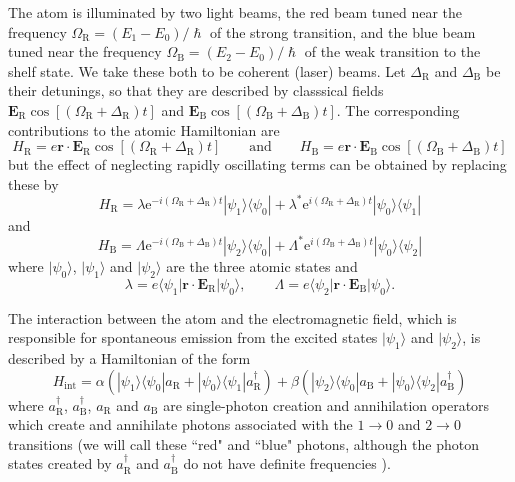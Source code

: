 \documentclass[12pt,a4paper,reqno]{article}
\newcommand{\upline}{\vspace{-\abovedisplayskip}\vspace{-\baselineskip}}
\renewcommand{\(}{\left(}
\renewcommand{\)}{\right)}
\newcommand{\e}{\mbox{e}}
\renewcommand{\hbar}{\hslash}
\newcommand{\tR}{\text{R}}
\newcommand{\tB}{\text{B}}
\newcommand{\br}{\mathbf{r}}
\newcommand{\bE}{\mathbf{E}}
\newcommand{\<}{\langle}
\renewcommand{\>}{\rangle}
\theoremstyle{plain} %
\theoremstyle{definition}
\theoremstyle{remark}
\begin{document}
The atom is illuminated by two light beams, the red
beam tuned near the frequency $\Omega_{\tR} = (E_1 - E_0)/\hbar$
of the strong transition, and the blue beam
tuned near the frequency $\Omega_{\tB} = (E_2 - E_0)/\hbar$ of the
weak transition to the shelf state. We take these both to be coherent
(laser) beams. Let $\Delta_{\tR}$ and $\Delta_{\tB}$ be their detunings, so
that they are described by classsical fields $\bE_{\tR}\cos[(\Omega_{\tR}
+ \Delta_{\tR})t]$ and $\bE_{\tB}\cos[(\Omega_{\tB} + \Delta_{\tB})t]$. The
corresponding contributions to the atomic Hamiltonian are
\[
H_{\tR} = e\br\cdot\bE_{\tR}\cos[(\Omega_{\tR} + \Delta_{\tR})t] \qquad \text{and}
\qquad H_{\tB} = e\br\cdot\bE_{\tB}\cos[(\Omega_{\tB} + \Delta_{\tB})t]
\]
but the effect of neglecting rapidly oscillating terms can be obtained
by replacing these by 
\begin{equation}
H_{\tR} = \lambda \e^{-i(\Omega_{\tR} + \Delta_{\tR})t}|\psi_1\>\<\psi_0| +
        \lambda^*\e^{i(\Omega_{\tR} + \Delta_{\tR})t}|\psi_0\>\<\psi_1|
\end{equation}
\upline
and
\begin{equation}
H_{\tB} = \Lambda \e^{-i(\Omega_{\tB} + \Delta_{\tB})t}|\psi_2\>\<\psi_0| +
        \Lambda^*\e^{i(\Omega_{\tB} + \Delta_{\tB})t}|\psi_0\>\<\psi_2| 
\end{equation}
where $|\psi_0\>$, $|\psi_1\>$ and $|\psi_2\>$ are the three atomic states and
\[
\lambda = e\<\psi_1|\br\cdot\bE_{\tR}|\psi_0\>, \qquad
\Lambda = e\<\psi_2|\br\cdot\bE_{\tB}|\psi_0\>.
\]

The interaction between the atom and the electromagnetic field, which is
responsible for spontaneous emission from the excited states $|\psi_1\>$ and
$|\psi_2\>$, is described by a Hamiltonian of the form \cite{rapid-dispersal}
\begin{equation}
H_{\text{int}} = \alpha\(|\psi_1\>\<\psi_0|a_{\tR} + |\psi_0\>\<\psi_1|a_{\tR}^\dagger\) + 
\beta\(|\psi_ 2\>\<\psi_0|a_{\tB} + |\psi_0\>\<\psi_2|a_{\tB}^\dagger\)
\end{equation}
where $a_{\tR}^\dagger$, $a_{\tB}^\dagger$, $a_{\tR}$ and $a_{\tB}$ are 
single-photon creation and annihilation operators which create and
annihilate photons associated with the $1\rightarrow 0$ and
$2\rightarrow 0$ transitions (we will call these ``red" and ``blue"
photons, although the photon states created by $a_{\tR}^\dagger$ and
$a_{\tB}^\dagger$ do not have definite frequencies \cite{rapid-dispersal}).
\end{document}
